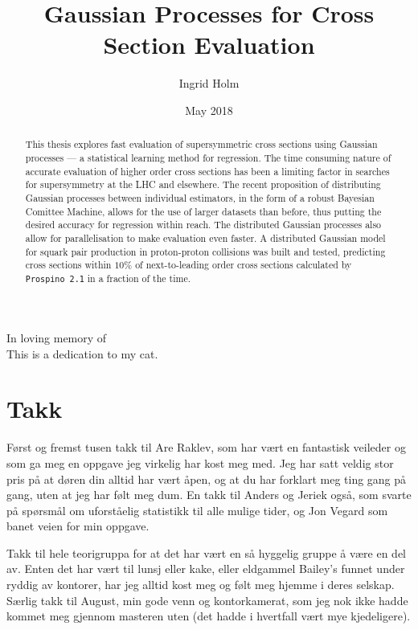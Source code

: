 \documentclass[twoside,english]{uiofysmaster}
\begin{document}
\title{Gaussian Processes for Cross Section Evaluation}
\author{Ingrid Holm}
\date{May 2018}

\maketitle

\begin{abstract}
This thesis explores fast evaluation of %
supersymmetric cross sections using Gaussian processes --- a statistical learning method for regression.  
The time consuming nature of accurate evaluation of higher order cross sections has been a limiting factor in searches for supersymmetry at the LHC and elsewhere.
The recent proposition of distributing Gaussian processes between individual estimators, in the form of a robust Bayesian Comittee Machine, allows for the use of larger datasets than before, thus putting the desired accuracy for regression within reach. The distributed Gaussian processes also allow for parallelisation to make evaluation even  faster. A distributed Gaussian model for squark pair production in proton-proton collisions was built and tested, predicting cross sections within $10 \%$ of next-to-leading order cross sections calculated by \verb|Prospino 2.1| in a fraction of the time.
\end{abstract}

\begin{dedication}
  In loving memory of
  \\\vspace{12pt}
  This is a dedication to my cat.
\end{dedication}


\chapter*{\centering Takk}
F{\o}rst og fremst tusen takk til Are Raklev, som har v{\ae}rt en fantastisk veileder og som ga meg en oppgave jeg virkelig har kost meg med. Jeg har satt veldig stor pris p{\aa} at d{\o}ren din alltid har vært {\aa}pen, og at du har forklart meg ting gang på gang, uten at jeg har følt meg dum. En takk til Anders og Jeriek ogs{\aa}, som svarte p{\aa} sp{\o}rsm{\aa}l om uforst{\aa}elig statistikk til alle mulige tider, og Jon Vegard som banet veien for min oppgave. 

Takk til hele teorigruppa for at det har v{\ae}rt en s{\aa} hyggelig gruppe {\aa} v{\ae}re en del av. Enten det har v{\ae}rt til lunsj eller kake, eller eldgammel Bailey's funnet under ryddig av kontorer, har jeg alltid kost meg og følt meg hjemme i deres selskap. S{\ae}rlig takk til August, min gode venn og kontorkamerat, som jeg nok ikke hadde kommet meg gjennom masteren uten (det hadde i hvertfall v{\ae}rt mye kjedeligere).
\end{document}
